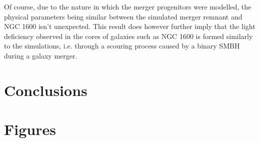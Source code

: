 \documentclass[english, oneside]{HYgradu}
\begin{document}
Of course, due to the nature in which the merger progenitors were modelled, the physical parameters being similar between the simulated merger remnant and NGC 1600 isn't unexpected. This result does however further imply that the light deficiency observed in the cores of galaxies such as NGC 1600 is formed similarly to the simulations, i.e. through a scouring process caused by a binary SMBH during a galaxy merger.


\chapter{Conclusions}

\appendix

\chapter{Figures}
\end{document}
